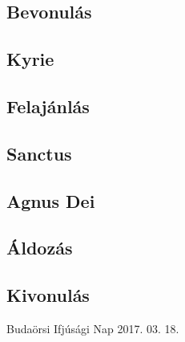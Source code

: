\documentclass[a5paper,twoside]{article}
\begin{document}
  \begin{songs}{}
    \begin{intersong*}\section*{Bevonulás}\end{intersong*}
    

    \begin{intersong*}\section*{Kyrie}\end{intersong*}
    

%     

    \begin{intersong*}\section*{Felajánlás}\end{intersong*}
    

    \begin{intersong*}\section*{Sanctus}\end{intersong*}
    

    \begin{intersong*}\section*{Agnus Dei}\end{intersong*}
    

    \begin{intersong*}\section*{Áldozás}\end{intersong*}
    
    
    

    \begin{intersong*}\section*{Kivonulás}\end{intersong*}
    
  \end{songs}

  \newpage\null
  \vfill\hfill
  Budaörsi Ifjúsági Nap
  \newline\null\hfill
  2017. 03. 18.
\end{document}
